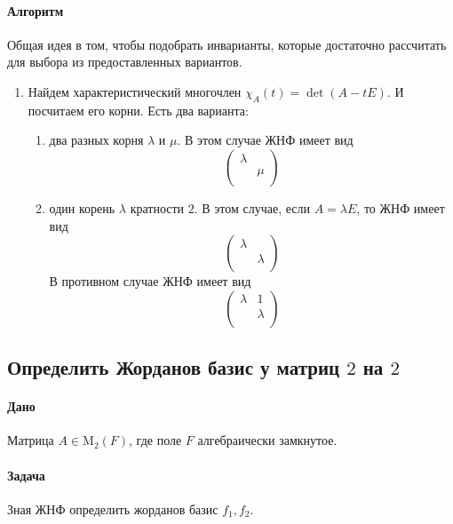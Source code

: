 \documentclass{article}
\newcommand{\Matrix}[2]{\operatorname{\mathrm{M}_{#2}}(#1)}
\begin{document}
\paragraph{Алгоритм}

Общая идея в том, чтобы подобрать инварианты, которые достаточно рассчитать для выбора из предоставленных вариантов.
\begin{enumerate}
\item Найдем характеристический многочлен $\chi_A(t) =\det(A - t E)$.
И посчитаем его корни.
Есть два варианта: 
\begin{enumerate}
\item два разных корня $\lambda$ и $\mu$.
В этом случае ЖНФ имеет вид
\[
\begin{pmatrix}
{\lambda}&{}\\
{}&{\mu}\\
\end{pmatrix}
\]

\item один корень $\lambda$ кратности $2$.
В этом случае, если $A = \lambda E$, то ЖНФ имеет вид
\[
\begin{pmatrix}
{\lambda}&{}\\
{}&{\lambda}\\
\end{pmatrix}
\]
В противном случае ЖНФ имеет вид
\[
\begin{pmatrix}
{\lambda}&{1}\\
{}&{\lambda}\\
\end{pmatrix}
\]
\end{enumerate}
\end{enumerate}

\subsection{Определить Жорданов базис у матриц $2$ на $2$}

\paragraph{Дано}

Матрица $A \in \Matrix{F}{2}$, где поле $F$ алгебраически замкнутое.

\paragraph{Задача}

Зная ЖНФ определить жорданов базис $f_1, f_2$.
\end{document}
